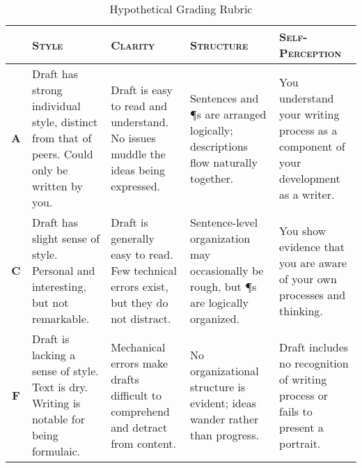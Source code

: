 \documentclass[10pt, oneside]{amsart}	%
\begin{document}
\begin{table}[h]
	{\small
\caption{Hypothetical Grading Rubric}\label{tab:rubric}
	\tablehead{}
\begin{tabular}{>{\bfseries}cp{1.4in}p{1.4in}p{1.4in}p{1.4in}}
\toprule & \textbf{\textsc{Style}} & \textbf{\textsc{Clarity}} & \textbf{\textsc{Structure}} & \textbf{\textsc{Self-Perception}}\\
	\midrule
A &
Draft has strong individual style, distinct from that of peers. Could only be written by you. &
Draft is easy to read and understand. No issues muddle the ideas being expressed. &
Sentences and ¶s are arranged logically; descriptions flow naturally together. &
You understand your writing process as a component of your development as a writer.
\\
\midrule
C &
Draft has slight sense of style. Personal and interesting, but not remarkable. &
Draft is generally easy to read. Few technical errors exist, but they do not distract. &
Sentence-level organization may occasionally be rough, but ¶s are logically organized. &
You show evidence that you are aware of your own processes and thinking.
\\
\midrule
F &
Draft is lacking a sense of style. Text is dry. Writing is notable for being formulaic. &
Mechanical errors make drafts difficult to comprehend and detract from content. &
No organizational structure is evident; ideas wander rather than progress. &
Draft includes no recognition of writing process or fails to present a portrait.
\\
	\bottomrule
\end{tabular}
} %
\end{table}
\end{document}
